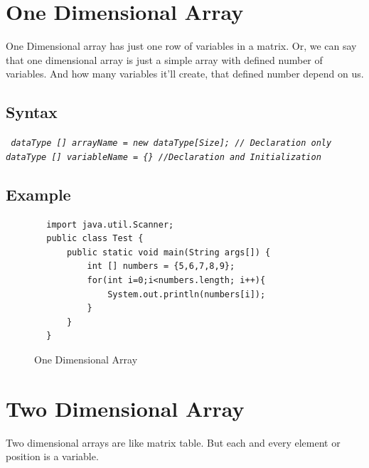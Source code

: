 \documentclass[openany]{book}  %
\begin{document}
\section{One Dimensional Array}
One Dimensional array has just one row of variables in a matrix.
Or, we can say that one dimensional array is just a simple array
with defined number of variables. And how many variables it'll
create, that defined number depend on us.
% 
%
\subsection{Syntax}
\begin{center}
    \tt{
        \textit{dataType [] arrayName = new dataType[Size]; // Declaration only \\
            dataType [] variableName = \{\} //Declaration and Initialization }
    }
\end{center}
% 
%
\subsection{Example}
\begin{center}
    \begin{verbatim}
        import java.util.Scanner;
        public class Test {
            public static void main(String args[]) {
                int [] numbers = {5,6,7,8,9};
                for(int i=0;i<numbers.length; i++){
                    System.out.println(numbers[i]);
                }
            }
        }
    \end{verbatim}
\end{center}
% 
% 
\begin{figure}[h!t]
    \begin{center}
        \caption{One Dimensional Array}
    \end{center}
\end{figure}
% 
% 
\section{Two Dimensional Array}
Two dimensional arrays are like matrix table. But each and every
element or position is a variable.
% 
% 
\end{document}
